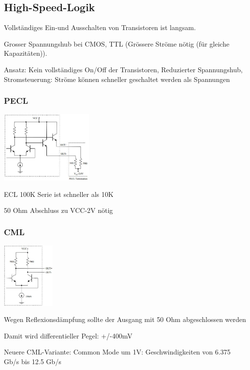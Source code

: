\subsection{High-Speed-Logik}
\begin{compactitem}
    \item Vollständiges Ein-und Ausschalten von Transistoren ist langsam.
    \item Grosser Spannungshub bei CMOS, TTL (Grössere Ströme nötig (für gleiche Kapazitäten)).
    \item Ansatz: Kein vollständiges On/Off der Transistoren, Reduzierter Spannungshub, Stromsteuerung: Ströme können schneller geschaltet werden als Spannungen
\end{compactitem}

\begin{multicols}{2}
    \subsubsection{PECL}
    \includegraphics[width=0.35\textwidth]{images/pecl}
    \begin{compactitem}
        \item ECL 100K Serie ist schneller als 10K
        \item 50 Ohm Abschluss zu VCC-2V nötig
    \end{compactitem}
    
    \subsubsection{CML}
    \includegraphics[width=0.20\textwidth]{images/cml}
    \begin{compactitem}
        \item Wegen Reflexionsdämpfung sollte der Ausgang mit 50 Ohm abgeschlossen werden
        \item Damit wird differentieller Pegel: +/-400mV
        \item Neuere CML-Variante: Common Mode um 1V: Geschwindigkeiten von 6.375 Gb/s bis 12.5 Gb/s
    \end{compactitem}
\end{multicols}

